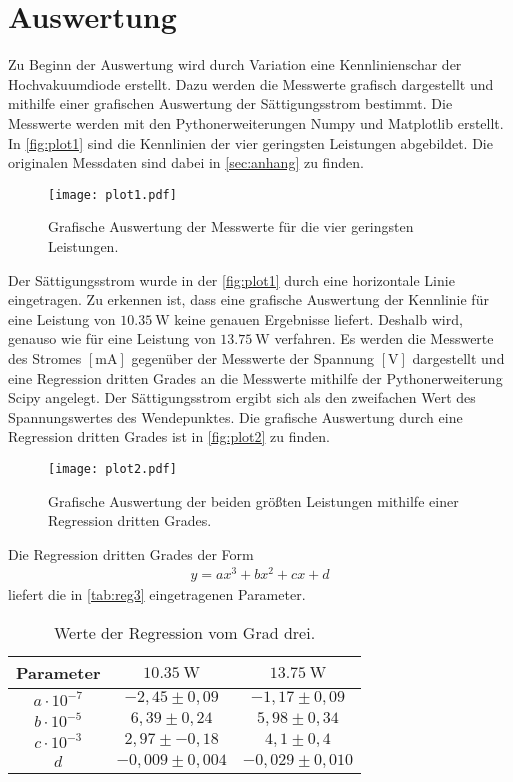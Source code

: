 \section{Auswertung}
\label{sec:Auswertung}

Zu Beginn der Auswertung wird durch Variation eine Kennlinienschar der Hochvakuumdiode erstellt. Dazu werden die Messwerte grafisch dargestellt und mithilfe einer grafischen Auswertung der Sättigungsstrom bestimmt.
Die Messwerte werden mit den Pythonerweiterungen Numpy \cite{numpy} und Matplotlib \cite{matplotlib} erstellt.
In \autoref{fig:plot1} sind die Kennlinien der vier geringsten Leistungen abgebildet. Die originalen Messdaten sind dabei in \autoref{sec:anhang} zu finden.

\begin{figure}[H]
  \centering
  \texttt{[image: plot1.pdf]}
  \caption{Grafische Auswertung der Messwerte für die vier geringsten Leistungen.}
  \label{fig:plot1}
\end{figure}

\noindent
Der Sättigungsstrom wurde in der \autoref{fig:plot1} durch eine horizontale Linie eingetragen. 
Zu erkennen ist, dass eine grafische Auswertung der Kennlinie für eine Leistung von
$\SI{10,35}{\watt}$ keine genauen Ergebnisse liefert. Deshalb wird, genauso wie für eine Leistung von $\SI{13,75}{\watt}$ verfahren.
Es werden die Messwerte des Stromes $[\si{\milli\ampere}]$ gegenüber der Messwerte der Spannung $[\si{\volt}]$ dargestellt und eine Regression dritten Grades an die Messwerte mithilfe der Pythonerweiterung
Scipy \cite{scipy} angelegt. Der Sättigungsstrom ergibt sich als den zweifachen Wert des Spannungswertes des Wendepunktes.
Die grafische Auswertung durch eine Regression dritten Grades ist in \autoref{fig:plot2} zu finden.

\begin{figure}[H]
  \centering
  \texttt{[image: plot2.pdf]}
  \caption{Grafische Auswertung der beiden größten Leistungen mithilfe einer Regression dritten Grades.}
  \label{fig:plot2}
\end{figure}

\noindent
Die Regression dritten Grades der Form
\begin{align*}
  y = ax^3+bx^2+cx+d  
\end{align*}
liefert die in \autoref{tab:reg3} eingetragenen Parameter.

\begin{table}[H]
  \caption{Werte der Regression vom Grad drei.}
  \label{tab:reg3}
  \centering
  \begin{tabular}{c c c}
      \toprule
      Parameter & $\SI{10,35}{\watt}$ & $\SI{13,75}{\watt}$ \\
      \midrule
      $a \cdot 10^{-7}$ & $-2,45 \pm 0,09$ & $-1,17 \pm 0,09$ \\
      $b \cdot 10^{-5}$ & $6,39 \pm 0,24$ & $5,98 \pm 0,34$ \\
      $c \cdot 10^{-3}$ & $2,97 \pm -0,18$ & $4,1 \pm 0,4$ \\
      $d$ & $-0,009 \pm 0,004$ & $-0,029 \pm 0,010$ \\
      \bottomrule
    \end{tabular}
\end{table}

